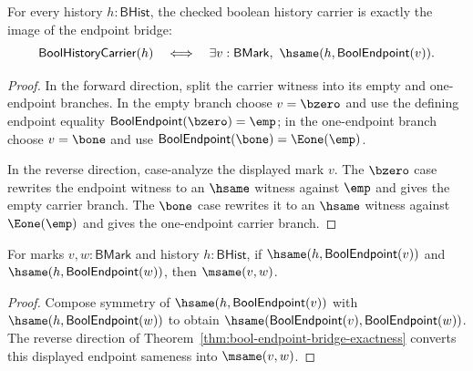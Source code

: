 \begin{theorem}
\label{thm:bool-history-carrier-endpoint-coverage}
For every history $h:\mathsf{BHist}$, the checked boolean history carrier is exactly the image of the endpoint bridge:
$$
  \mathsf{BoolHistoryCarrier}(h)
  \quad\Longleftrightarrow\quad
  \exists v:\mathsf{BMark},\ \hsame(h,\mathsf{BoolEndpoint}(v)).
$$
\end{theorem}
\begin{proof}
In the forward direction, split the carrier witness into its empty and one-endpoint branches. In the empty branch choose $v=\bzero$ and use the defining endpoint equality $\mathsf{BoolEndpoint}(\bzero)=\emp$; in the one-endpoint branch choose $v=\bone$ and use $\mathsf{BoolEndpoint}(\bone)=\Eone(\emp)$.

In the reverse direction, case-analyze the displayed mark $v$. The $\bzero$ case rewrites the endpoint witness to an $\hsame$ witness against $\emp$ and gives the empty carrier branch. The $\bone$ case rewrites it to an $\hsame$ witness against $\Eone(\emp)$ and gives the one-endpoint carrier branch.
\end{proof}

\begin{theorem}
\label{thm:bool-endpoint-readback-determinism}
For marks $v,w:\mathsf{BMark}$ and history $h:\mathsf{BHist}$, if
$\hsame(h,\mathsf{BoolEndpoint}(v))$ and
$\hsame(h,\mathsf{BoolEndpoint}(w))$, then $\msame(v,w)$.
\end{theorem}
\begin{proof}
Compose symmetry of $\hsame(h,\mathsf{BoolEndpoint}(v))$ with
$\hsame(h,\mathsf{BoolEndpoint}(w))$ to obtain
$\hsame(\mathsf{BoolEndpoint}(v),\mathsf{BoolEndpoint}(w))$. The reverse
direction of Theorem~\ref{thm:bool-endpoint-bridge-exactness} converts this
displayed endpoint sameness into $\msame(v,w)$.
\end{proof}

